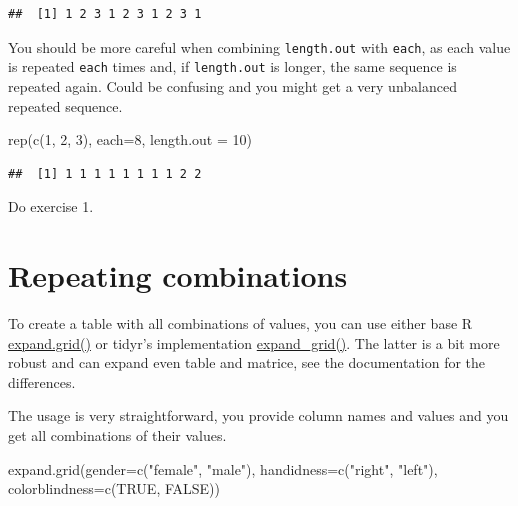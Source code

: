 \documentclass[
]{book}
\newenvironment{Shaded}{\begin{snugshade}}{\end{snugshade}}
\newcommand{\AttributeTok}[1]{\textcolor[rgb]{0.77,0.63,0.00}{#1}}
\newcommand{\ConstantTok}[1]{\textcolor[rgb]{0.00,0.00,0.00}{#1}}
\newcommand{\DecValTok}[1]{\textcolor[rgb]{0.00,0.00,0.81}{#1}}
\newcommand{\FunctionTok}[1]{\textcolor[rgb]{0.00,0.00,0.00}{#1}}
\newcommand{\NormalTok}[1]{#1}
\newcommand{\StringTok}[1]{\textcolor[rgb]{0.31,0.60,0.02}{#1}}
\begin{document}
\begin{verbatim}
##  [1] 1 2 3 1 2 3 1 2 3 1
\end{verbatim}

You should be more careful when combining \texttt{length.out} with \texttt{each}, as each value is repeated \texttt{each} times and, if \texttt{length.out} is longer, the same sequence is repeated again. Could be confusing and you might get a very unbalanced repeated sequence.

\begin{Shaded}
\begin{Highlighting}[]
\FunctionTok{rep}\NormalTok{(}\FunctionTok{c}\NormalTok{(}\DecValTok{1}\NormalTok{, }\DecValTok{2}\NormalTok{, }\DecValTok{3}\NormalTok{), }\AttributeTok{each=}\DecValTok{8}\NormalTok{, }\AttributeTok{length.out =} \DecValTok{10}\NormalTok{)}
\end{Highlighting}
\end{Shaded}

\begin{verbatim}
##  [1] 1 1 1 1 1 1 1 1 2 2
\end{verbatim}

Do exercise 1.

\hypertarget{repeating-combinations}{%
\section{Repeating combinations}\label{repeating-combinations}}

To create a table with all combinations of values, you can use either base R \href{https://stat.ethz.ch/R-manual/R-devel/library/base/html/expand.grid.html}{expand.grid()} or tidyr's implementation \href{https://tidyr.tidyverse.org/reference/expand_grid.html}{expand\_grid()}. The latter is a bit more robust and can expand even table and matrice, see the documentation for the differences.

The usage is very straightforward, you provide column names and values and you get all combinations of their values.

\begin{Shaded}
\begin{Highlighting}[]
\FunctionTok{expand.grid}\NormalTok{(}\AttributeTok{gender=}\FunctionTok{c}\NormalTok{(}\StringTok{"female"}\NormalTok{, }\StringTok{"male"}\NormalTok{), }
            \AttributeTok{handidness=}\FunctionTok{c}\NormalTok{(}\StringTok{"right"}\NormalTok{, }\StringTok{"left"}\NormalTok{),}
            \AttributeTok{colorblindness=}\FunctionTok{c}\NormalTok{(}\ConstantTok{TRUE}\NormalTok{, }\ConstantTok{FALSE}\NormalTok{))}
\end{Highlighting}
\end{Shaded}
\end{document}
